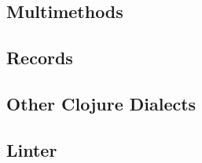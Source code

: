 \documentclass{cshonours}
\begin{document}
\subsection{Multimethods}

\subsection{Records}

\subsection{Other Clojure Dialects}

\subsection{Linter}

%
%

%

\end{document}
